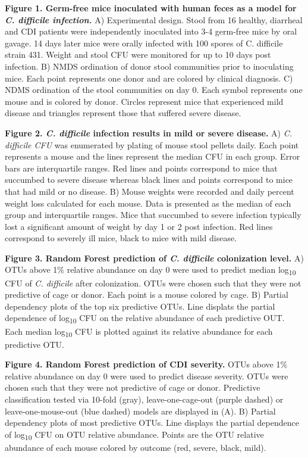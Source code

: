 \documentclass[11pt,]{article}
\begin{document}
\textbf{Figure 1. Germ-free mice inoculated with human feces as a model
for \emph{C. difficile infection.}} A) Experimental design. Stool from
16 healthy, diarrheal and CDI patients were independently inoculated
into 3-4 germ-free mice by oral gavage. 14 days later mice were orally
infected with 100 spores of C. difficile strain 431. Weight and stool
CFU were monitored for up to 10 days post infection. B) NMDS ordination
of donor stool communities prior to inoculating mice. Each point
represents one donor and are colored by clinical diagnosis. C) NDMS
ordination of the stool communities on day 0. Each symbol represents one
mouse and is colored by donor. Circles represent mice that experienced
mild disease and triangles represent those that suffered severe disease.

\textbf{Figure 2. \emph{C. difficile} infection results in mild or
severe disease.} A) \emph{C. difficile CFU} was enumerated by plating of
mouse stool pellets daily. Each point represents a mouse and the lines
represent the median CFU in each group. Error bars are interquartile
ranges. Red lines and points correspond to mice that succumbed to severe
disease whereas black lines and points correspond to mice that had mild
or no disease. B) Mouse weights were recorded and daily percent weight
loss calculated for each mouse. Data is presented as the median of each
group and interquartile ranges. Mice that succumbed to severe infection
typically lost a significant amount of weight by day 1 or 2 post
infection. Red lines correspond to severely ill mice, black to mice with
mild disease.

\textbf{Figure 3. Random Forest prediction of \emph{C. difficile}
colonization level.} A) OTUs above 1\% relative abundance on day 0 were
used to predict median log\textsubscript{10} CFU of \emph{C. difficile}
after colonization. OTUs were chosen such that they were not predictive
of cage or donor. Each point is a mouse colored by cage. B) Partial
dependency plots of the top six predictive OTUs. Line displats the
partial dependence of log\textsubscript{10} CFU on the relative
abundance of each predictive OUT. Each median log\textsubscript{10} CFU
is plotted against its relative abundance for each predictive OTU.

\textbf{Figure 4. Random Forest prediction of CDI severity.} OTUs above
1\% relative abundance on day 0 were used to predict disease severity.
OTUs were chosen such that they were not predictive of cage or donor.
Predictive classification tested via 10-fold (gray), leave-one-cage-out
(purple dashed) or leave-one-mouse-out (blue dashed) models are
displayed in (A). B) Partial dependency plots of most predictive OTUs.
Line displays the partial dependence of log\textsubscript{10} CFU on OTU
relative abundance. Points are the OTU relative abundance of each mouse
colored by outcome (red, severe, black, mild).
\end{document}
